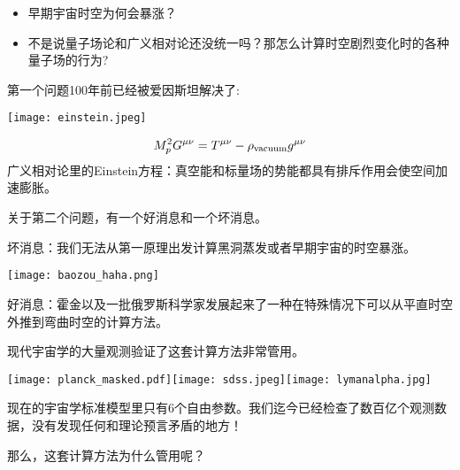\documentclass[CJK]{beamer}
\begin{document}
\begin{frame}
\bch
\begin{itemize}
\item{早期宇宙时空为何会暴涨？}
\item{不是说量子场论和广义相对论还没统一吗？那怎么计算时空剧烈变化时的各种量子场的行为?}
\end{itemize}
\ech
\end{frame}

\begin{frame}
\bch
第一个问题100年前已经被爱因斯坦解决了:

\begin{minipage}{0.45\textwidth}
\texttt{[image: einstein.jpeg]}
\end{minipage}
\begin{minipage}{0.45\textwidth}
$$ M_p^2 G^{\mu\nu} =  T^{\mu\nu} - \rho_{\rm vacuum} g^{\mu\nu} $$
广义相对论里的Einstein方程：真空能和标量场的势能都具有排斥作用会使空间加速膨胀。

\end{minipage}
\ech
\end{frame}

\begin{frame}
\bch
关于第二个问题，有一个好消息和一个坏消息。
\ech
\end{frame}

\begin{frame}
\bch
\begin{minipage}{0.6\textwidth}
坏消息：我们无法从第一原理出发计算黑洞蒸发或者早期宇宙的时空暴涨。
\end{minipage}
\begin{minipage}{0.3\textwidth}
\texttt{[image: baozou\_haha.png]}
\end{minipage}

\skipline
\skipline

好消息：霍金以及一批俄罗斯科学家发展起来了一种在特殊情况下可以从平直时空外推到弯曲时空的计算方法。
\ech
\end{frame}


\begin{frame}
\bch
现代宇宙学的大量观测验证了这套计算方法非常管用。

\texttt{[image: planck\_masked.pdf]}\texttt{[image: sdss.jpeg]}\texttt{[image: lymanalpha.jpg]}

现在的宇宙学标准模型里只有6个自由参数。我们迄今已经检查了数百亿个观测数据，没有发现任何和理论预言矛盾的地方！

\skipline
\skipline
那么，这套计算方法为什么管用呢？
\ech
\end{frame}
\end{document}

